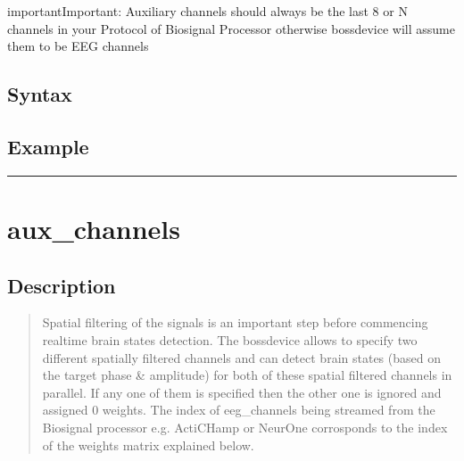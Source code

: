 \documentclass[letterpaper,10pt,english]{sphinxmanual}
\begin{document}
\begin{sphinxadmonition}{important}{Important:}
\sphinxAtStartPar
Auxiliary channels should always be the last 8 or N channels in your Protocol of Biosignal Processor otherwise bossdevice will assume them to be EEG channels
\end{sphinxadmonition}


\subsection{Syntax}
\label{\detokenize{4_api_documentation:id17}}
\begin{sphinxVerbatim}[commandchars=\\\{\}]
\PYG{p}{[}\PYG{p}{]}
\end{sphinxVerbatim}


\subsection{Example}
\label{\detokenize{4_api_documentation:id18}}
\begin{sphinxVerbatim}[commandchars=\\\{\}]
\end{sphinxVerbatim}


\bigskip\hrule\bigskip



\section{aux\_channels}
\label{\detokenize{4_api_documentation:id19}}

\subsection{Description}
\label{\detokenize{4_api_documentation:id20}}\begin{quote}

\sphinxAtStartPar
Spatial filtering of the signals is an important step before commencing real\sphinxhyphen{}time brain states detection. The bossdevice allows to specify two different spatially filtered channels and can detect brain states (based on the target phase \& amplitude) for both of these spatial filtered channels in parallel. If any one of them is specified then the other one is ignored and assigned 0 weights. The index of eeg\_channels being streamed from the Biosignal processor e.g. ActiCHamp or NeurOne corrosponds to the index of the weights matrix explained below.
\end{quote}
\end{document}
